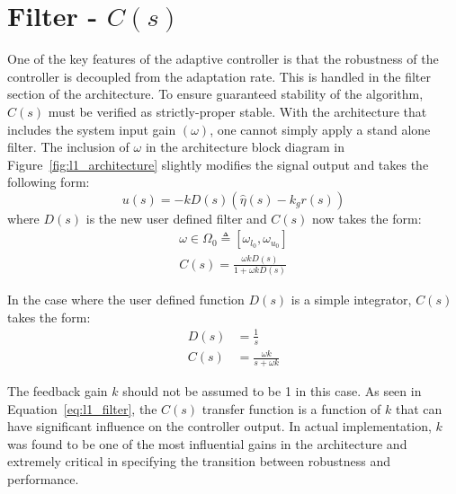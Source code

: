 \section{\Lone Filter - $C(s)$}\label{sec:l1_filter}
One of the key features of the \Lone adaptive controller is that the robustness of the controller is decoupled from the adaptation rate.  This is handled in the filter section of the \Lone architecture.  To ensure guaranteed stability of the \Lone algorithm, $C(s)$ must be verified as strictly-proper stable.  With the architecture that includes the system input gain $(\omega)$, one cannot simply apply a stand alone filter.  The inclusion of $\omega$ in the architecture block diagram in Figure~\ref{fig:l1_architecture} slightly modifies the signal output and takes the following form:
\begin{equation}
u(s)=-kD(s)(\hat{\eta}(s)-k_gr(s))
\end{equation}
where $D(s)$ is the new user defined filter and $C(s)$ now takes the form:
\begin{equation}
\begin{split}
\omega \in \Omega_0 \triangleq [\omega_{l_0},\omega_{u_0}]\\
C(s)=\frac{\omega kD(s)}{1+\omega kD(s)}
\end{split}
\end{equation}

In the case where the user defined function $D(s)$ is a simple integrator, $C(s)$ takes the form:
\begin{equation}\label{eq:l1_filter}
\begin{split}
D(s)&=\frac{1}{s}\\
C(s)&=\frac{\omega k}{s+\omega k}
\end{split}
\end{equation}

The feedback gain $k$ should not be assumed to be 1 in this case.  As seen in Equation~\ref{eq:l1_filter}, the $C(s)$ transfer function is a function of $k$ that can have significant influence on the controller output.  In actual implementation, $k$ was found to be one of the most influential gains in the architecture and extremely critical in specifying the transition between robustness and performance.


